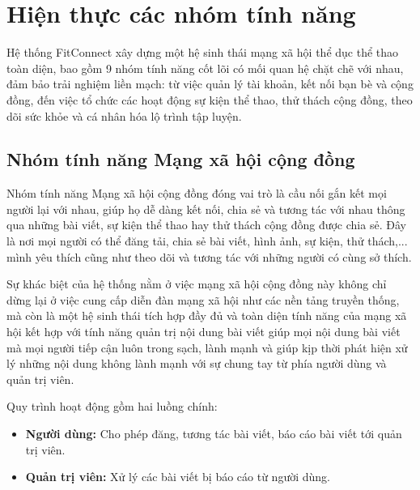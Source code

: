 \section{Hiện thực các nhóm tính năng}
\label{sec:impl_features}

Hệ thống FitConnect xây dựng một hệ sinh thái mạng xã hội thể dục thể thao toàn diện, bao gồm 9 nhóm tính năng cốt lõi có mối quan hệ chặt chẽ với nhau, đảm bảo trải nghiệm liền mạch: từ việc quản lý tài khoản, kết nối bạn bè và cộng đồng, đến việc tổ chức các hoạt động sự kiện thể thao, thử thách cộng đồng, theo dõi sức khỏe và cá nhân hóa lộ trình tập luyện.


\subsection{Nhóm tính năng Mạng xã hội cộng đồng}
\label{subsec:impl_social}

Nhóm tính năng Mạng xã hội cộng đồng đóng vai trò là cầu nối gắn kết mọi người lại với nhau, giúp họ dễ dàng kết nối, chia sẻ và tương tác với nhau thông qua những bài viết, sự kiện thể thao hay thử thách cộng đồng được chia sẻ. Đây là nơi mọi người có thể đăng tải, chia sẻ bài viết, hình ảnh, sự kiện, thử thách,... mình yêu thích cũng như theo dõi và tương tác với những người có cùng sở thích.

Sự khác biệt của hệ thống nằm ở việc mạng xã hội cộng đồng này không chỉ dừng lại ở việc cung cấp diễn đàn mạng xã hội như các nền tảng truyền thống, mà còn là một hệ sinh thái tích hợp đầy đủ và toàn diện tính năng của mạng xã hội kết hợp với tính năng quản trị nội dung bài viết giúp mọi nội dung bài viết mà mọi người tiếp cận luôn trong sạch, lành mạnh và giúp kịp thời phát hiện xử lý những nội dung không lành mạnh với sự chung tay từ phía người dùng và quản trị viên.

Quy trình hoạt động gồm hai luồng chính:
\begin{itemize}
    \item \textbf{Người dùng:} Cho phép đăng, tương tác bài viết, báo cáo bài viết tới quản trị viên.
    \item \textbf{Quản trị viên:} Xử lý các bài viết bị báo cáo từ người dùng.
\end{itemize}

